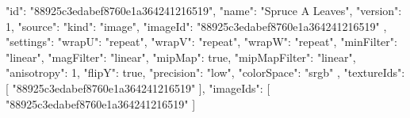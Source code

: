 {
  "id": "88925c3edabef8760e1a364241216519",
  "name": "Spruce A Leaves",
  "version": 1,
  "source": {
    "kind": "image",
    "imageId": "88925c3edabef8760e1a364241216519"
  },
  "settings": {
    "wrapU": "repeat",
    "wrapV": "repeat",
    "wrapW": "repeat",
    "minFilter": "linear",
    "magFilter": "linear",
    "mipMap": true,
    "mipMapFilter": "linear",
    "anisotropy": 1,
    "flipY": true,
    "precision": "low",
    "colorSpace": "srgb"
  },
  "textureIds": [
    "88925c3edabef8760e1a364241216519"
  ],
  "imageIds": [
    "88925c3edabef8760e1a364241216519"
  ]
}
